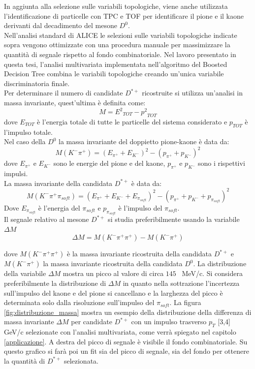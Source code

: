 In aggiunta alla selezione sulle variabili topologiche, viene anche utilizzata l'identificazione di particelle con TPC e TOF per identificare il pione e il kaone derivanti dal decadimento del mesone $D^0$.
\\Nell'analisi standard di ALICE le selezioni sulle variabili topologiche indicate sopra vengono ottimizzate con una procedura manuale per massimizzare la quantit\`a di segnale rispetto al fondo combinatoriale. Nel lavoro presentato in questa tesi, l'analisi multivariata implementata nell'algoritmo del Boosted Decision Tree combina le variabili topologiche creando un'unica variabile discriminatoria finale.
\\Per determinare il numero di candidate $D^{*+}$ ricostruite  si utilizza un'analisi in massa invariante, quest'ultima \`e definita come: 
    \begin{equation}
        M = {E^2}_{TOT} - {p^2}_{TOT}
    \end{equation}
dove $E_{TOT}$ \`e l'energia totale di tutte le particelle del sistema considerato e $p_{TOT}$ \`e l'impulso totale. 
\\Nel caso della $D^0$ la massa invariante del doppietto pione-kaone \`e data da:  
    \begin{equation}
        M(K^- \pi^+) = ({E_{\pi^+}+E_{K^-}})^2 - ({p_{\pi^+}+p_{K^-}})^2
    \end{equation}
dove $E_{\pi^+}$ e $E_{K^-}$ sono le energie del pione e del kaone, $p_{\pi^+}$ e $p_{K^-}$ sono i rispettivi impulsi.
\\La massa invariante della candidata $D^{*+}$ \`e data da:
    \begin{equation}
        M(K^- \pi^+ \pi_{soft}) = ({E_{\pi^+}+E_{K^-}+E_{\pi_{soft}}})^2 - ({p_{\pi^+}+p_{K^-}+p_{\pi_{soft}}})^2
    \end{equation}
Dove $E_{\pi_{soft}}$ \`e l'energia del $\pi_{soft}$ e $p_{\pi_{soft}}$ \`e l'impulso del $\pi_{soft}$.
\\Il segnale relativo al mesone $D^{*+}$ si studia preferibilmente usando la variabile $\Delta M$
  \begin{equation}
       \Delta M = M (K^- \pi^+ \pi^+) - M(K^- \pi^+)
    \end{equation}
    
dove $ M (K^- \pi^+ \pi^+)$ \`e la massa invariante ricostruita della candidata $D^{*+}$ e $ M(K^- \pi^+)$ la massa invariante ricostruita della candidata $D^{0}$. La distribuzione della variabile $\Delta M$ mostra un picco al valore di circa $145$~ MeV/c. Si considera preferibilmente la distribuzione di $\Delta M$ in quanto nella sottrazione l'incertezza sull'impulso del kaone e del pione si cancellano e la larghezza del picco \`e determinata solo dalla risoluzione sull'impulso del $\pi_{soft}$. La figura \ref{fig:distribuzione_massa} mostra un esempio della distribuzione della differenza di massa invariante $\Delta M$ per candidate $D^{*+}$ con un impulso trasverso $p_T$ [3,4] GeV/c selezionate con l'analisi multivariata, come verr\`a spiegato nel capitolo \ref{applicazione}. A destra del picco di segnale \`e visibile il fondo combinatoriale. Su questo grafico si far\`a poi un fit sia del picco di segnale, sia del fondo per ottenere la quantit\`a di $D^{*+}$ selezionata. 

